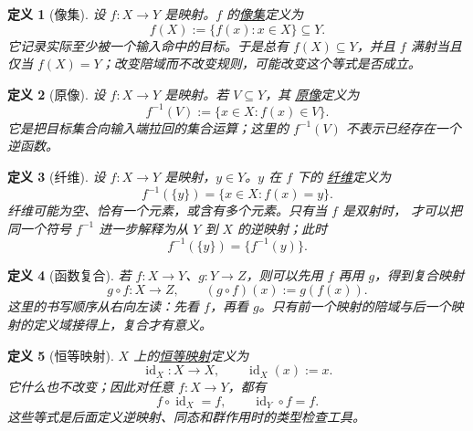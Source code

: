 \documentclass[UTF8,fontset=none,a4paper,11pt]{ctexart}
\theoremstyle{foundation-definition}
\newtheorem{definition}{定义}[section]
\theoremstyle{foundation-theorem}
\theoremstyle{foundation-proposition}
\theoremstyle{foundation-example}
\theoremstyle{foundation-remark}
\theoremstyle{foundation-theorem}
\newcommand{\term}[2]{\hyperref[#1]{#2}}
\begin{document}
\begin{definition}[像集]\label{def:image-set}
设 \(f:X\to Y\) 是映射。\(f\) 的\term{def:image-set}{像集}定义为
\[
f(X):=\{f(x):x\in X\}\subseteq Y.
\]
它记录实际至少被一个输入命中的目标。于是总有 \(f(X)\subseteq Y\)，并且
\(f\) 满射当且仅当 \(f(X)=Y\)；改变陪域而不改变规则，可能改变这个等式是否成立。
\end{definition}

\begin{definition}[原像]\label{def:preimage}
设 \(f:X\to Y\) 是映射。若 \(V\subseteq Y\)，其
\term{def:preimage}{原像}定义为
\[
  f^{-1}(V):=\{x\in X:f(x)\in V\}.
\]
它是把目标集合向输入端拉回的集合运算；这里的 \(f^{-1}(V)\) 不表示已经存在一个逆函数。
\end{definition}

\begin{definition}[纤维]\label{def:fiber}
设 \(f:X\to Y\) 是映射，\(y\in Y\)。\(y\) 在 \(f\) 下的
\term{def:fiber}{纤维}定义为
\[
  f^{-1}(\{y\})=\{x\in X:f(x)=y\}.
\]
纤维可能为空、恰有一个元素，或含有多个元素。只有当 \(f\) 是双射时，
才可以把同一个符号 \(f^{-1}\) 进一步解释为从 \(Y\) 到 \(X\) 的逆映射；此时
\[
  f^{-1}(\{y\})=\{f^{-1}(y)\}.
\]
\end{definition}

\begin{definition}[函数复合]\label{def:function-composition}
若 \(f:X\to Y\)、\(g:Y\to Z\)，则可以先用 \(f\) 再用 \(g\)，得到复合映射
\[
  g\circ f:X\longrightarrow Z,
  \qquad (g\circ f)(x):=g(f(x)).
\]
这里的书写顺序从右向左读：先看 \(f\)，再看 \(g\)。只有前一个映射的陪域与后一个映射的定义域接得上，复合才有意义。
\end{definition}

\begin{definition}[恒等映射]\label{def:identity-map}
\(X\) 上的\term{def:identity-map}{恒等映射}定义为
\[
  \operatorname{id}_X:X\longrightarrow X,
  \qquad \operatorname{id}_X(x):=x.
\]
它什么也不改变；因此对任意 \(f:X\to Y\)，都有
\[
  f\circ\operatorname{id}_X=f,
  \qquad \operatorname{id}_Y\circ f=f.
\]
这些等式是后面定义逆映射、同态和群作用时的类型检查工具。
\end{definition}
\end{document}
